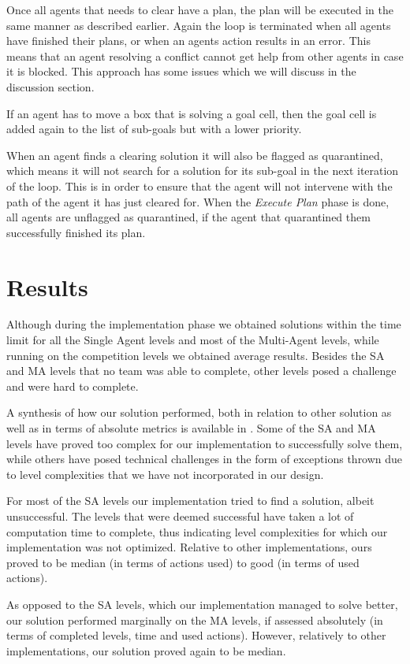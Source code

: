 \documentclass[letterpaper]{article}
\begin{document}
Once all agents that needs to clear have a plan, the plan will be executed in the same manner as described earlier. Again the loop is terminated when all agents have finished their plans, or when an agents action results in an error. This means that an agent resolving a conflict cannot get help from other agents in case it is blocked. This approach has some issues which we will discuss in the discussion section.

If an agent has to move a box that is solving a goal cell, then the goal cell is added again to the list of sub-goals but with a lower priority.

When an agent finds a clearing solution it will also be flagged as quarantined, which means it will not search for a solution for its sub-goal in the next iteration of the loop. This is in order to ensure that the agent will not intervene with the path of the agent it has just cleared for. When the \textit{Execute Plan} phase is done, all agents are unflagged as quarantined, if the agent that quarantined them successfully finished its plan. 


\section{Results}
Although during the implementation phase we obtained solutions within the time limit for all the Single Agent levels and most of the Multi-Agent levels, while running on the competition levels we obtained average results. Besides the SA and MA levels that no team was able to complete, other levels posed a challenge and were hard to complete.

A synthesis of how our solution performed, both in relation to other solution as well as in terms of absolute metrics is available in \cite{compResults}. Some of the SA and MA levels have proved too complex for our implementation to successfully solve them, while others have posed technical challenges in the form of exceptions thrown due to level complexities that we have not incorporated in our design.

For most of the SA levels our implementation tried to find a solution, albeit unsuccessful. The levels that were deemed successful have taken a lot of computation time to complete, thus indicating level complexities for which our implementation was not optimized. Relative to other implementations, ours proved to be median (in terms of actions used) to good (in terms of used actions).

As opposed to the SA levels, which our implementation managed to solve better, our solution performed marginally on the MA levels, if assessed absolutely (in terms of completed levels, time and used actions). However, relatively to other implementations, our solution proved again to be median.
\end{document}
